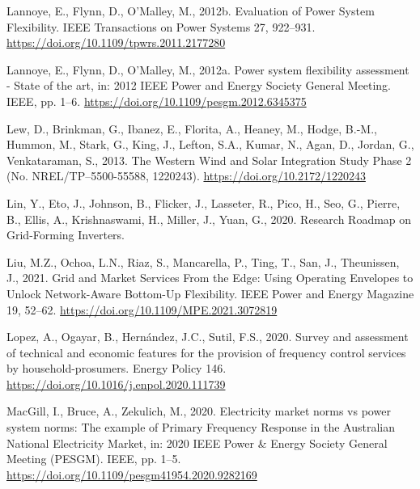 \documentclass[12pt,a4paper,]{report}
\newlength{\cslhangindent}
\newenvironment{CSLReferences}[2] %
 {%
  \setlength{\parindent}{0pt}
  \ifodd #1 \everypar{\setlength{\hangindent}{\cslhangindent}}\ignorespaces\fi
  \ifnum #2 > 0
  \setlength{\parskip}{#2\baselineskip}
  \fi
 }%
 {}
\begin{document}
\begin{CSLReferences}{1}{0}
\leavevmode{}%
Lannoye, E., Flynn, D., O'Malley, M., 2012b. Evaluation of {Power System
Flexibility}. IEEE Transactions on Power Systems 27, 922--931.
\url{https://doi.org/10.1109/tpwrs.2011.2177280}

\leavevmode{}%
Lannoye, E., Flynn, D., O'Malley, M., 2012a. Power system flexibility
assessment - {State} of the art, in: 2012 {IEEE Power} and {Energy
Society General Meeting}. {IEEE}, pp. 1--6.
\url{https://doi.org/10.1109/pesgm.2012.6345375}

\leavevmode{}%
Lew, D., Brinkman, G., Ibanez, E., Florita, A., Heaney, M., Hodge,
B.-M., Hummon, M., Stark, G., King, J., Lefton, S.A., Kumar, N., Agan,
D., Jordan, G., Venkataraman, S., 2013. The {Western Wind} and {Solar
Integration Study Phase} 2 (No. NREL/TP--5500-55588, 1220243).
\url{https://doi.org/10.2172/1220243}

\leavevmode{}%
Lin, Y., Eto, J., Johnson, B., Flicker, J., Lasseter, R., Pico, H., Seo,
G., Pierre, B., Ellis, A., Krishnaswami, H., Miller, J., Yuan, G., 2020.
Research {Roadmap} on {Grid-Forming Inverters}.

\leavevmode{}%
Liu, M.Z., Ochoa, L.N., Riaz, S., Mancarella, P., Ting, T., San, J.,
Theunissen, J., 2021. Grid and {Market Services From} the {Edge}: {Using
Operating Envelopes} to {Unlock Network-Aware Bottom-Up Flexibility}.
IEEE Power and Energy Magazine 19, 52--62.
\url{https://doi.org/10.1109/MPE.2021.3072819}

\leavevmode{}%
Lopez, A., Ogayar, B., Hernández, J.C., Sutil, F.S., 2020. Survey and
assessment of technical and economic features for the provision of
frequency control services by household-prosumers. Energy Policy 146.
\url{https://doi.org/10.1016/j.enpol.2020.111739}

\leavevmode{}%
MacGill, I., Bruce, A., Zekulich, M., 2020. Electricity market norms vs
power system norms: The example of {Primary Frequency Response} in the
{Australian National Electricity Market}, in: 2020 {IEEE Power} \&
{Energy Society General Meeting} ({PESGM}). {IEEE}, pp. 1--5.
\url{https://doi.org/10.1109/pesgm41954.2020.9282169}


\end{CSLReferences}
\end{document}

